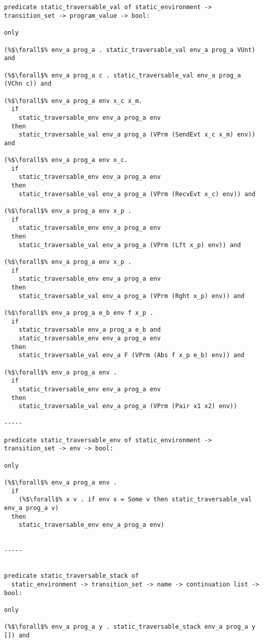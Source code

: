 \documentclass{article}
\begin{document}
\begin{lstlisting}[language=logic, style=codestyle1, escapechar=\%]


predicate static_traversable_val of static_environment -> transition_set -> program_value -> bool:

only

(%$\forall$% env_a prog_a . static_traversable_val env_a prog_a VUnt) and 

(%$\forall$% env_a prog_a c . static_traversable_val env_a prog_a (VChn c)) and

(%$\forall$% env_a prog_a env x_c x_m.
  if
    static_traversable_env env_a prog_a env 
  then 
    static_traversable_val env_a prog_a (VPrm (SendEvt x_c x_m) env)) and

(%$\forall$% env_a prog_a env x_c.
  if
    static_traversable_env env_a prog_a env 
  then
    static_traversable_val env_a prog_a (VPrm (RecvEvt x_c) env)) and

(%$\forall$% env_a prog_a env x_p .
  if
    static_traversable_env env_a prog_a env 
  then
    static_traversable_val env_a prog_a (VPrm (Lft x_p) env)) and

(%$\forall$% env_a prog_a env x_p .
  if
    static_traversable_env env_a prog_a env
  then
    static_traversable_val env_a prog_a (VPrm (Rght x_p) env)) and

(%$\forall$% env_a prog_a e_b env f x_p .
  if
    static_traversable env_a prog_a e_b and 
    static_traversable_env env_a prog_a env
  then
    static_traversable_val env_a F (VPrm (Abs f x_p e_b) env)) and

(%$\forall$% env_a prog_a env . 
  if
    static_traversable_env env_a prog_a env
  then
    static_traversable_val env_a prog_a (VPrm (Pair x1 x2) env))

-----

predicate static_traversable_env of static_environment -> transition_set -> env -> bool: 

only 

(%$\forall$% env_a prog_a env .
  if
    (%$\forall$% x v . if env x = Some v then static_traversable_val env_a prog_a v)
  then
    static_traversable_env env_a prog_a env) 


-----


predicate static_traversable_stack of
  static_environment -> transition_set -> name -> continuation list -> bool:

only

(%$\forall$% env_a prog_a y . static_traversable_stack env_a prog_a y []) and


\end{lstlisting}
\end{document}
